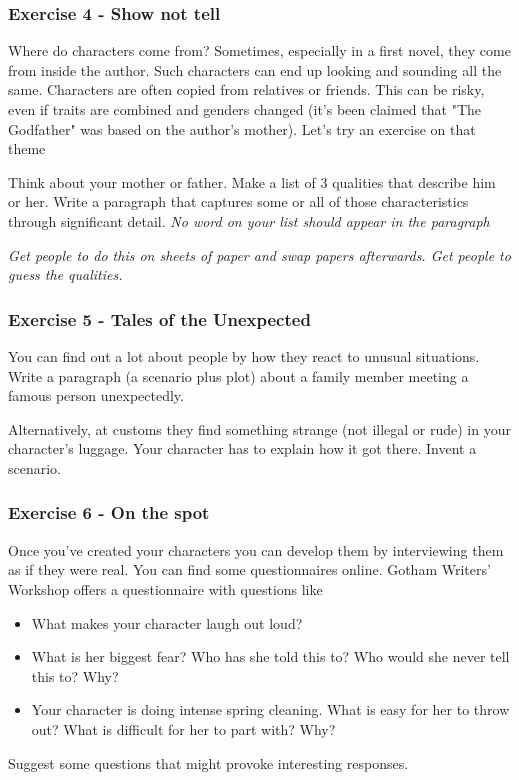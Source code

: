 \documentclass[11pt]{article}
\newenvironment{narrow}[2]{%
 \begin{list}{}{%
  \setlength{\topsep}{0pt}%
  \setlength{\leftmargin}{#1}%
  \setlength{\rightmargin}{#2}%
  \setlength{\listparindent}{\parindent}%
  \setlength{\itemindent}{\parindent}%
  \setlength{\parsep}{\parskip}%
 }%
\item[]}{\end{list}}
\begin{document}
\subsubsection*{Exercise 4 - Show not tell}
Where do characters come from? Sometimes, especially in a first novel, they come from inside the author. Such characters can end up looking and sounding all the same. Characters are often copied from relatives or friends. This can be risky, even if traits are combined and genders changed (it's been claimed that "The Godfather" was based on the author's mother). Let's try an exercise on that theme
\begin{narrow}{1.0cm}{1.0cm}
Think about your mother or father. Make a list of 3 qualities that describe him
or her. Write a paragraph that captures some or all of those characteristics
through significant detail. \textit{No word on your list should appear in the
paragraph}
\end{narrow}

\textit{Get people to do this on sheets of paper and swap papers afterwards. Get
    people to guess the qualities.}




\subsubsection*{Exercise 5 - Tales of the Unexpected}
\begin{narrow}{1.0cm}{1.0cm}

You can find out a lot about people by how they react to unusual situations.
Write a paragraph (a scenario plus plot) about a family member meeting a famous person unexpectedly.

Alternatively, at customs they find something strange (not illegal or rude) in your character's luggage.
Your character has to explain how it got there. Invent a scenario.

\end{narrow}


\subsubsection*{Exercise 6 - On the spot}
Once you've created your characters you can develop them by interviewing them as if they were real. You can find some questionnaires online. Gotham Writers' Workshop offers a questionnaire with questions like 


\begin{itemize} 
\item  What makes your character laugh out loud?  
\item  What is her biggest fear? Who has she told this to? Who would she never tell this to? Why? 
\item  Your character is doing intense spring cleaning. What is easy for her to throw out? What is difficult for her to part with? Why? 
\end{itemize}
\begin{narrow}{1.0cm}{1.0cm}
Suggest some questions that might provoke interesting responses.
\end{narrow}
\end{document}
